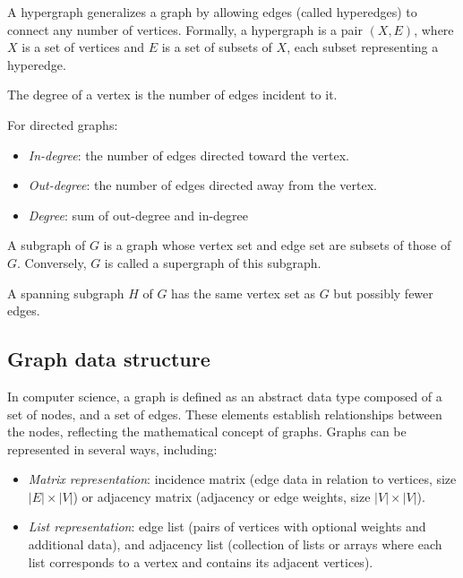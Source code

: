 \begin{definition}
    A hypergraph generalizes a graph by allowing edges (called hyperedges) to connect any number of vertices. 
    Formally, a hypergraph is a pair $(X, E)$, where $X$ is a set of vertices and $E$ is a set of subsets of $X$, each subset representing a hyperedge.
\end{definition}
\begin{definition}
    The degree of a vertex is the number of edges incident to it.
\end{definition}
For directed graphs:
\begin{itemize}
    \item \textit{In-degree}: the number of edges directed toward the vertex.
    \item \textit{Out-degree}: the number of edges directed away from the vertex.
    \item \textit{Degree}: sum of out-degree and in-degree
\end{itemize}
\begin{definition}
    A subgraph of $G$ is a graph whose vertex set and edge set are subsets of those of $G$. 
    Conversely, $G$ is called a supergraph of this subgraph.
\end{definition}
\begin{definition}
    A spanning subgraph $H$ of $G$ has the same vertex set as $G$ but possibly fewer edges.
\end{definition}

\subsection{Graph data structure}
In computer science, a graph is defined as an abstract data type composed of a set of nodes, and a set of edges. 
These elements establish relationships between the nodes, reflecting the mathematical concept of graphs.
Graphs can be represented in several ways, including:
\begin{itemize}
    \item \textit{Matrix representation}: incidence matrix (edge data in relation to vertices, size $\left\lvert E\right\rvert \times\left\lvert V\right\rvert $) or adjacency matrix (adjacency or edge weights, size $\left\lvert V\right\rvert\times\left\lvert V\right\rvert$). 
    \item \textit{List representation}: edge list (pairs of vertices with optional weights and additional data), and adjacency list (collection of lists or arrays where each list corresponds to a vertex and contains its adjacent vertices).
\end{itemize}